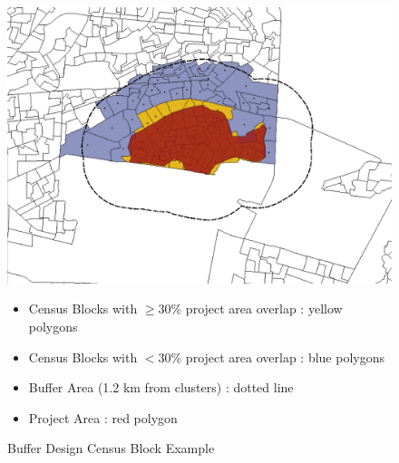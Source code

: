 \documentclass[12pt]{article}
\begin{document}
\begin{figure}
\caption{Buffer Design Census Block Example}\label{figure:bufferdesigncensus}
\centering
\includegraphics[scale=.4]{figures/design_7.png} 
\begin{itemize}
\item Census Blocks with $\geq$30\% project area overlap : yellow polygons 
\item Census Blocks with $<$30\% project area overlap : blue polygons
\item Buffer Area (1.2 km from clusters) : dotted line
\item Project Area : red polygon
\end{itemize}
\end{figure}

\end{document}
